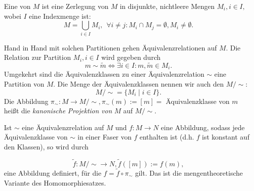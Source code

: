\documentclass[12pt]{book}   %
\begin{document}
Eine  von $M$ ist eine Zerlegung von $M$ in 
disjunkte, nichtleere Mengen $M_i,i\in I,$ wobei $I$ eine Indexmenge ist:
$$M=\bigcup_{i\in I} M_i,\ \ \forall i\neq j: M_i\cap M_j = \emptyset, 
M_i\neq\emptyset.$$

Hand in Hand mit solchen Partitionen gehen \"Aquivalenzrelationen auf $M.$
Die Relation zur Partition $M_i,i\in I$ wird gegeben durch
$$m\sim \tilde m \iff \exists i\in I: m,\tilde m\in M_i.$$
Umgekehrt sind die \"Aquivalenzklassen zu einer \"Aquivalenzrelation $\sim $ 
eine Partition von $M.$ Die Menge der \"Aquivalenzklassen nennen wir auch den
 $M/\sim$:
$$M/\sim = \{M_i\mid i\in I\}.$$
Die Abbildung $\pi_\sim: M\longrightarrow M/\sim, \pi_\sim(m):= [m] = $ 
\"Aquivalenzklasse von $m$ heißt die {\it kanonische Projektion von } $M$ 
auf $M/\sim$.

Ist $\sim$ eine \"Aquivalenzrelation auf $M$ und $f:M\longrightarrow N$ eine
Abbildung, sodass
jede \"Aquivalenzklasse von $\sim$ in einer Faser von $f$ enthalten ist (d.h.
$f$ ist konstant auf den Klassen), so wird durch 

$$\tilde f:M/\sim \longrightarrow N, \tilde f([m]) := f(m),$$
eine Abbildung definiert, für die $f=\tilde f \circ \pi_\sim$ gilt. Das ist
die mengentheoretische Variante des Homomorphiesatzes.
\end{document}
